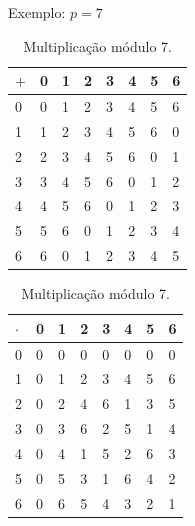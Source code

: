 \documentclass[portuguese,aspectratio=169]{beamer}
\begin{document}
\begin{frame}[allowframebreaks]
Exemplo: $p=7$
\begin{table}[!htb]
    \begin{minipage}{.5\linewidth}
      \caption{Adicção módulo 7.}
      \centering
        \begin{tabular}{l|lllllll}
          $+$ & 0 & 1 & 2 & 3 & 4 & 5 & 6 \\
          \hline
          0 & 0 & 1 & 2 & 3 & 4 & 5 & 6 \\
          1 & 1 & 2 & 3 & 4 & 5 & 6 & 0 \\
          2 & 2 & 3 & 4 & 5 & 6 & 0 & 1 \\
          3 & 3 & 4 & 5 & 6 & 0 & 1 & 2 \\
          4 & 4 & 5 & 6 & 0 & 1 & 2 & 3 \\
          5 & 5 & 6 & 0 & 1 & 2 & 3 & 4 \\
          6 & 6 & 0 & 1 & 2 & 3 & 4 & 5
        \end{tabular}
    \end{minipage}%
    \begin{minipage}{.5\linewidth}
      \centering
        \caption{Multiplicação módulo 7.}
        \begin{tabular}{l|lllllll}
        $\cdot$ & 0 & 1 & 2 & 3 & 4 & 5 & 6 \\
        \hline
        0 & 0 & 0 & 0 & 0 & 0 & 0 & 0 \\
        1 & 0 & 1 & 2 & 3 & 4 & 5 & 6 \\
        2 & 0 & 2 & 4 & 6 & 1 & 3 & 5 \\
        3 & 0 & 3 & 6 & 2 & 5 & 1 & 4 \\
        4 & 0 & 4 & 1 & 5 & 2 & 6 & 3 \\
        5 & 0 & 5 & 3 & 1 & 6 & 4 & 2 \\
        6 & 0 & 6 & 5 & 4 & 3 & 2 & 1
        \end{tabular}
    \end{minipage} 
\end{table}

\end{frame}
\end{document}
